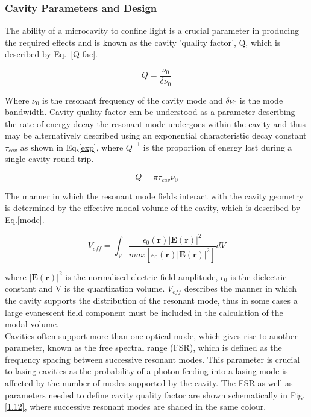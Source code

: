 \subsubsection{Cavity Parameters and Design}
The ability of a microcavity to confine light is a crucial parameter in producing the required effects and is known as the cavity 'quality factor', Q, which is described by Eq.~\ref{Q-fac}.

\begin{equation}\label{Q-fac}
Q = \frac{\nu_{0}}{\delta\nu_{0}}
\end{equation}

Where $\nu_{0}$ is the resonant frequency of the cavity mode and $\delta\nu_{0}$ is the mode bandwidth. Cavity quality factor can be understood as a parameter describing the rate of energy decay the resonant mode undergoes within the cavity and thus may be alternatively described using an exponential characteristic decay constant $\tau_{cav}$ as shown in Eq.\ref{exp}, where $Q^{-1}$ is the proportion of energy lost during a single cavity round-trip.

\begin{equation}\label{exp}
Q = \pi\tau_{cav} \nu_{0}
\end{equation}

The manner in which the resonant mode fields interact with the cavity geometry is determined by the effective modal volume of the cavity, which is described by Eq.\ref{mode}.

\begin{equation}\label{mode}
V_{eff}= \int_{V}\frac{\epsilon_{0}(\mathbf{r})|\mathbf{E}(\mathbf{r})|^{2}}{max[\epsilon_{0}(\mathbf{r})|\mathbf{E}(\mathbf{r})|^{2}]}dV
\end{equation}

where $|\mathbf{E}(\mathbf{r})|^{2}$ is the normalised electric field amplitude, $\epsilon_{0}$ is the dielectric constant and V is the quantization volume. $V_{eff}$ describes the manner in which the cavity supports the distribution of the resonant mode, thus in some cases a large evanescent field component must be included in the calculation of the modal volume.
\\ Cavities often support more than one optical mode, which gives rise to another parameter, known as the free spectral range  (FSR), which is defined as the frequency spacing between successive resonant modes. This parameter is crucial to lasing cavities as the probability of a photon feeding into a lasing mode is affected by the number of modes supported by the cavity. The FSR as well as parameters needed to define cavity quality factor are shown schematically in Fig.\ref{1.12}, where successive resonant modes are shaded in the same colour.

